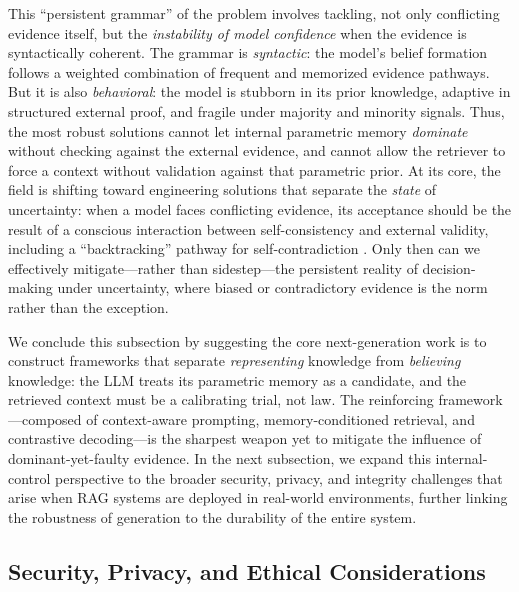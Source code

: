 \documentclass[11pt]{article}
\begin{document}
This ``persistent grammar'' of the problem involves tackling, not only conflicting evidence itself, but the \emph{instability of model confidence} when the evidence is syntactically coherent. The grammar is \emph{syntactic}: the model's belief formation follows a weighted combination of frequent and memorized evidence pathways. But it is also \emph{behavioral}: the model is stubborn in its prior knowledge, adaptive in structured external proof, and fragile under majority and minority signals. Thus, the most robust solutions cannot let internal parametric memory \emph{dominate} without checking against the external evidence, and cannot allow the retriever to force a context without validation against that parametric prior. At its core, the field is shifting toward engineering solutions that separate the \emph{state} of uncertainty: when a model faces conflicting evidence, its acceptance should be the result of a conscious interaction between self-consistency and external validity, including a ``backtracking'' pathway for self-contradiction \cite{ref189}. Only then can we effectively mitigate---rather than sidestep---the persistent reality of decision-making under uncertainty, where biased or contradictory evidence is the norm rather than the exception.

We conclude this subsection by suggesting the core next-generation work is to construct frameworks that separate \emph{representing} knowledge from \emph{believing} knowledge: the LLM treats its parametric memory as a candidate, and the retrieved context must be a calibrating trial, not law. The reinforcing framework---composed of context-aware prompting, memory-conditioned retrieval, and contrastive decoding---is the sharpest weapon yet to mitigate the influence of dominant-yet-faulty evidence. In the next subsection, we expand this internal-control perspective to the broader security, privacy, and integrity challenges that arise when RAG systems are deployed in real-world environments, further linking the robustness of generation to the durability of the entire system.

\subsection{Security, Privacy, and Ethical Considerations}
\end{document}
